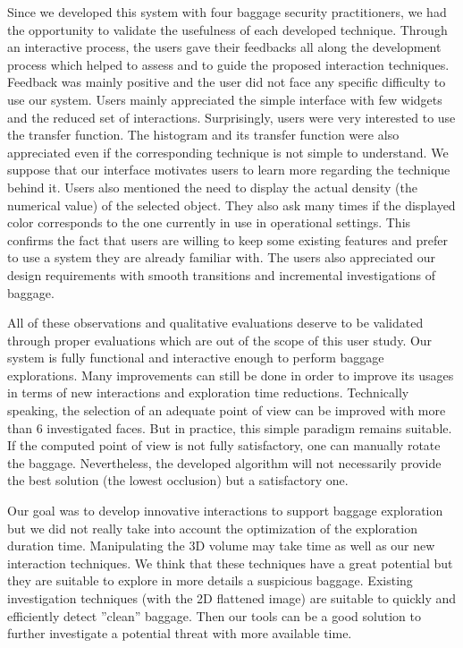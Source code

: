 Since we developed this system with four baggage security practitioners, we had the opportunity to validate the usefulness of each developed technique. Through an interactive process, the users gave their feedbacks all along the development process which helped to assess and to guide the proposed interaction techniques. Feedback was mainly positive and the user did not face any specific difficulty to use our system. Users mainly appreciated the simple interface with few widgets and the reduced set of interactions. Surprisingly, users were very interested to use the transfer function. The histogram and its transfer function were also appreciated even if the corresponding technique is not simple to understand. We suppose that our interface motivates users to learn more regarding the technique behind it. Users also mentioned the need to display the actual density (the numerical value) of the selected object. They also ask many times if the displayed color corresponds to the one currently in use in operational settings. This confirms the fact that users are willing to keep some existing features and prefer to use a system they are already familiar with.
The users also appreciated our design requirements with smooth transitions and incremental investigations of baggage.
\par All of these observations and qualitative evaluations deserve to be validated through proper evaluations which are out of the scope of this user study.
Our system is fully functional and interactive enough to perform baggage explorations. Many improvements can still be done in order to improve its usages in terms of new interactions and exploration time reductions.
Technically speaking, the selection of an adequate point of view can be improved with more than 6 investigated faces. But in practice, this simple paradigm remains suitable. If the computed point of view is not fully satisfactory, one can manually rotate the baggage. Nevertheless, the developed algorithm will not necessarily provide the best solution (the lowest occlusion) but a satisfactory one.
\par Our goal was to develop
innovative interactions to support baggage exploration but we did not really take into account the optimization of the exploration duration time. Manipulating the 3D volume may take time as well as our new interaction techniques. We think that these techniques have a great potential but they are suitable to explore in more details a suspicious baggage. Existing investigation techniques (with the 2D flattened image) are suitable to quickly and efficiently detect ''clean'' baggage. Then our tools can be a good solution to further investigate a potential threat with more available time.